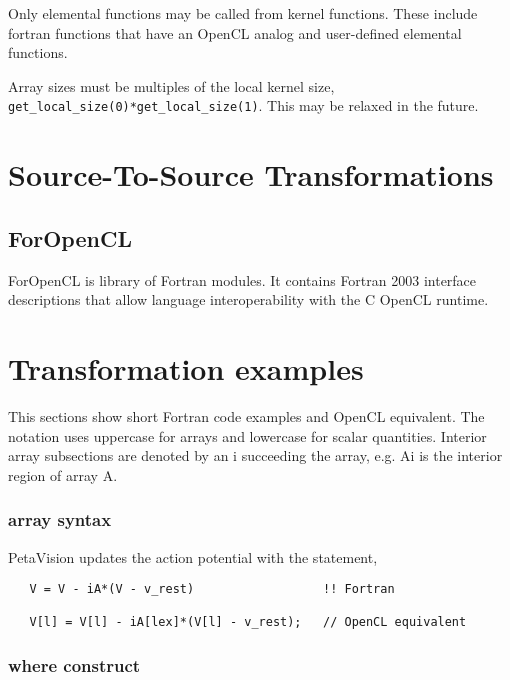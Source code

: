 \documentclass[10pt, conference, compsocconf]{IEEEtran}
\begin{document}
Only elemental functions may be called from kernel functions.  These include
fortran functions that have an OpenCL analog and user-defined elemental functions.

Array sizes must be multiples of the local kernel size,
{\tt get\_local\_size(0)*get\_local\_size(1)}.  This may be relaxed in the future.


\section{Source-To-Source Transformations}


\subsection{ForOpenCL}

ForOpenCL is library of Fortran modules.  It contains Fortran 2003 interface
descriptions that allow language interoperability with the C OpenCL runtime.

\section{Transformation examples}

This sections show short Fortran code examples and OpenCL equivalent.
The notation uses uppercase for arrays and lowercase for scalar quantities.
Interior array subsections are denoted by an i succeeding the array, e.g. Ai
is the interior region of array A.

\subsubsection{array syntax}

PetaVision updates the action potential with the statement,

\begin{verbatim}
   V = V - iA*(V - v_rest)                  !! Fortran

   V[l] = V[l] - iA[lex]*(V[l] - v_rest);   // OpenCL equivalent
\end{verbatim}

\subsubsection{where construct}
\end{document}
